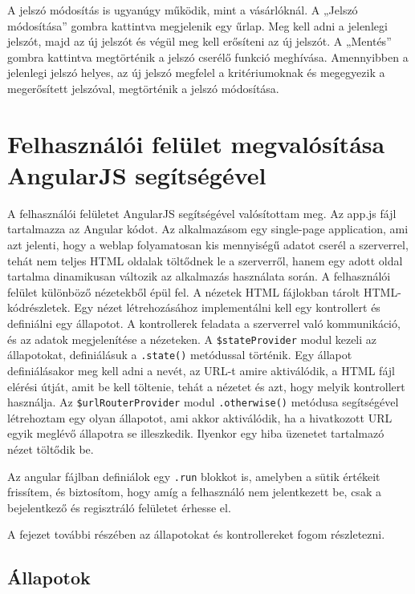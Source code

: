 A jelszó módosítás is ugyanúgy működik, mint a vásárlóknál. A „Jelszó módosítása” gombra kattintva megjelenik egy űrlap. Meg kell adni a jelenlegi jelszót, majd az új jelszót és végül meg kell erősíteni az új jelszót. A „Mentés” gombra kattintva megtörténik a jelszó cserélő funkció meghívása. Amennyibben a jelenlegi jelszó helyes, az új jelszó megfelel a kritériumoknak és megegyezik a megerősített jelszóval, megtörténik a jelszó módosítása.

\section{Felhasználói felület megvalósítása AngularJS segítségével}

A felhasználói felületet AngularJS segítségével valósítottam meg. Az app.js fájl tartalmazza az Angular kódot. Az alkalmazásom egy single-page application, ami azt jelenti, hogy a weblap folyamatosan kis mennyiségű adatot cserél a szerverrel, tehát nem teljes HTML oldalak töltődnek le a szerverről, hanem egy adott oldal tartalma dinamikusan változik az alkalmazás használata során. A felhasználói felület különböző nézetekből épül fel. A nézetek HTML fájlokban tárolt HTML-kódrészletek. Egy nézet létrehozásához implementálni kell egy kontrollert és definiálni egy állapotot. A kontrollerek feladata a szerverrel való kommunikáció, és az adatok megjelenítése a nézeteken. A \texttt{\$stateProvider} modul kezeli az állapotokat, definiálásuk a \texttt{.state()} metódussal történik. Egy állapot definiálásakor meg kell adni a nevét, az URL-t amire aktiválódik, a HTML fájl elérési útját, amit be kell töltenie, tehát a nézetet és azt, hogy melyik kontrollert használja. Az \texttt{\$urlRouterProvider} modul \texttt{.otherwise()} metódusa segítségével létrehoztam egy olyan állapotot, ami akkor aktiválódik, ha a hivatkozott URL egyik meglévő állapotra se illeszkedik. Ilyenkor egy hiba üzenetet tartalmazó nézet töltődik be.

Az angular fájlban definiálok egy \texttt{.run} blokkot is, amelyben a sütik értékeit frissítem, és biztosítom, hogy amíg a felhasználó nem jelentkezett be, csak a bejelentkező és regisztráló felületet érhesse el.

A fejezet további részében az állapotokat és kontrollereket fogom részletezni.

\subsection{Állapotok}

